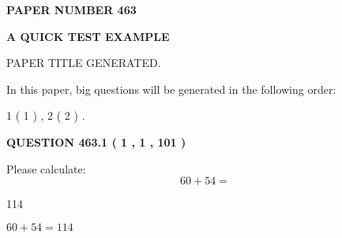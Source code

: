 \documentclass[12pt]{article}
\begin{document}
   
   
   
\newpage 
\setcounter{page}{ 
   463001 } 
   
   
   
   
 {\textbf{ \Large{ PAPER NUMBER  463  }}}
   
   
\vspace{0.2in}
   
   
   
   
   
   
   
   
 \vspace{0.2in}
{\LARGE {\textbf{ A QUICK TEST EXAMPLE}}}
   
   
 PAPER TITLE GENERATED.
   
   
   
\vspace{0.2in}
   
In this paper, big questions will be generated in the following order: 
   
   
   1 ( 1 )
 ,
   2 ( 2 )
 .
  
\vspace{0.2in}
  
{\textbf{\Large{QUESTION
463.1 
 ( 1 , 1 , 101 )
}}}
  
  
 
Please calculate:
\begin{equation}
60 +  %
54 = \nonumber
\end{equation}
 
 
 
\noindent{}
 
 

114
 
 
\noindent{}
 
 

 
 
 
\noindent{}
 
 

$ %
60 +  %
54=   %
114$
 
 
\noindent{}
 
 

 
   
\end{document}
